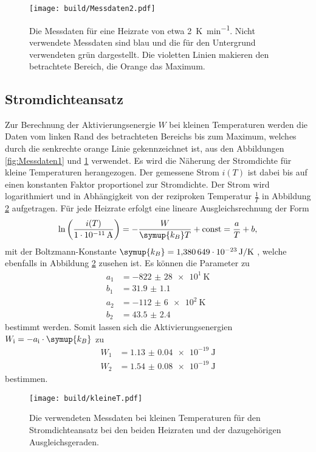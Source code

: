 \begin{figure}[htb]
  \centering
  \texttt{[image: build/Messdaten2.pdf]}
  \caption{Die Messdaten für eine Heizrate von etwa \SI{2}{\kelvin\per\minute}. Nicht verwendete Messdaten sind blau und die für den Untergrund verwendeten grün dargestellt. Die violetten Linien makieren den betrachtete Bereich, die Orange das Maximum.}
  \label{fig:Messdaten2}
\end{figure}
\FloatBarrier

\subsection{Stromdichteansatz}
\label{sec:klT}
Zur Berechnung der Aktivierungsenergie $W$ bei kleinen Temperaturen werden die Daten vom linken Rand des betrachteten Bereichs bis zum Maximum, welches durch die senkrechte orange Linie gekennzeichnet ist,
aus den Abbildungen \ref{fig:Messdaten1} und \ref{fig:Messdaten2} verwendet. Es wird die Näherung der Stromdichte für kleine Temperaturen
herangezogen. Der gemessene Strom $i(T)$ ist dabei bis auf einen konstanten Faktor proportionel zur Stromdichte. Der Strom wird logarithmiert
und in Abhängigkeit von der reziproken Temperatur $\frac{1}{T}$ in Abbildung \ref{fig:klT} aufgetragen. Für jede Heizrate erfolgt eine lineare Ausgleichsrechnung der Form
\begin{equation}
    \label{eqn:lin}
    \ln\left(\frac{i(T)}{\SI{1e-11}{\ampere}}\right) = -\frac{W}{\symup{k_B} T} + \text{const} = \frac{a}{T} + b,
\end{equation}
mit der Boltzmann-Konstante $\symup{k_B} = \SI{1.380649e-23}{\joule\per\kelvin}$ \cite{codata}, welche ebenfalls in Abbildung \ref{fig:klT} zusehen ist.
Es können die Parameter zu
\begin{align*}
    a_1 &= \SI{-822(28)e1}{\kelvin} \\
    b_1 &= \num{31.9(11)} \\
    a_2 &= \SI{-112(6)e2}{\kelvin} \\
    b_2 &= \num{43.5(24)}
\end{align*}
bestimmt werden.
Somit lassen sich die Aktivierungsenergien $W_\text{i} = -a_\text{i} \cdot \symup{k_B}$ zu
\begin{align*}
    W_1 &= \SI{1.13(4)e-19}{\joule} \\
    W_2 &= \SI{1.54(8)e-19}{\joule}
\end{align*}
bestimmen.
\begin{figure}[htb]
  \centering
  \texttt{[image: build/kleineT.pdf]}
  \caption{Die verwendeten Messdaten bei kleinen Temperaturen für den Stromdichteansatz bei den beiden Heizraten und der dazugehörigen Ausgleichsgeraden.}
  \label{fig:klT}
\end{figure}
\FloatBarrier

